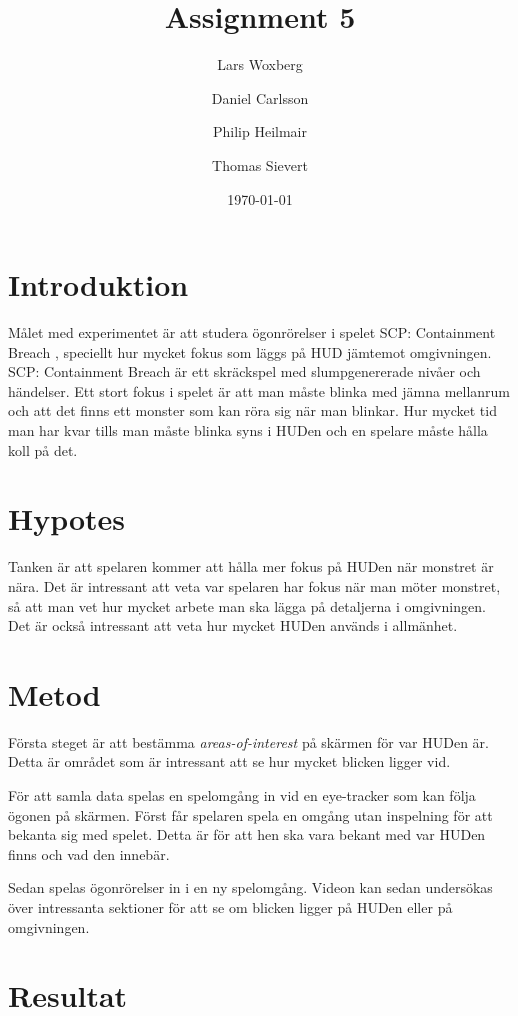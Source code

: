 \documentclass{article}
\author{Lars Woxberg \and Daniel Carlsson \and Philip Heilmair \and Thomas Sievert}
\date{\today}
\title{Assignment 5}
\begin{document}
\maketitle


\section{Introduktion}
Målet med experimentet är att studera ögonrörelser i spelet SCP: Containment Breach \cite{SCP}, speciellt hur mycket fokus som läggs på HUD jämtemot omgivningen. SCP: Containment Breach är ett skräckspel med slumpgenererade nivåer och händelser. Ett stort fokus i spelet är att man måste blinka med jämna mellanrum och att det finns ett monster som kan röra sig när man blinkar. Hur mycket tid man har kvar tills man måste blinka syns i HUDen och en spelare måste hålla koll på det.

\section{Hypotes}
Tanken är att spelaren kommer att hålla mer fokus på HUDen när monstret är nära. Det är intressant att veta var spelaren har fokus när man möter monstret, så att man vet hur mycket arbete man ska lägga på detaljerna i omgivningen. Det är också intressant att veta hur mycket HUDen används i allmänhet.

\section{Metod}
Första steget är att bestämma \textit{areas-of-interest} på skärmen för var HUDen är. Detta är området som är intressant att se hur mycket blicken ligger vid.

För att samla data spelas en spelomgång in vid en eye-tracker som kan följa ögonen på skärmen. Först får spelaren spela en omgång utan inspelning för att bekanta sig med spelet. Detta är för att hen ska vara bekant med var HUDen finns och vad den innebär. 

Sedan spelas ögonrörelser in i en ny spelomgång. Videon kan sedan undersökas över intressanta sektioner för att se om blicken ligger på HUDen eller på omgivningen.

\section{Resultat}
\end{document}

